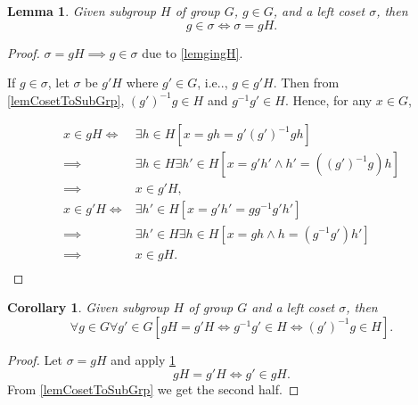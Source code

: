 \documentclass[12pt, letterpaper]{article}
\makeatletter
\newcommand\ie{i.e\@ifnextchar.{}{.\@}}
\newtheorem{lem}[prop]{Lemma}
\newtheorem{cor}[prop]{Corollary}
\theoremstyle{definition}
\theoremstyle{remark}
\theoremstyle{definition}
\theoremstyle{plain}
\numberwithin{equation}{section}
\makeatother
\begin{document}

	\begin{lem}\label{lemSameCoset}
		Given subgroup $H$ of group $G$, $g\in G$, and a left coset $\sigma$,
		then
		\[g\in \sigma\iff\sigma=gH. \]
	\end{lem}
	\begin{proof}
		$\sigma=gH\implies g\in\sigma$ due to \ref{lemgingH}.
		
		If $g\in \sigma$, let $\sigma$ be $g'H$ where $g'\in G$,
		\ie, $g\in g'H$.
		Then from \ref{lemCosetToSubGrp}, $(g')^{-1}g\in H$ and $g^{-1}g'\in H$.
		Hence, for any $x\in G$,
		
		\[ \begin{aligned}
			x\in gH \iff& \exists h\in H[x=gh=g'(g')^{-1}gh] \\
			\implies& \exists h \in H\exists h'\in H[x=g'h'\land h'=((g')^{-1}g)h]\\
			\implies &x\in g'H,\\
			x\in g'H\iff& \exists h'\in H[x=g'h'=gg^{-1}g'h'] \\
			\implies& \exists h' \in H\exists h\in H[x=gh\land h=(g^{-1}g')h']\\
			\implies &x\in gH.\\
		\end{aligned}\]
	\end{proof}

	\begin{cor}\label{lemgHg'H}
		Given subgroup $H$ of group $G$ and a left coset $\sigma$,
		then
		\[ \forall g\in G \forall g'\in G [gH=g'H\iff g^{-1}g'\in H\iff (g')^{-1}g\in H].\]
	\end{cor}
	\begin{proof}
		Let $\sigma=gH$ and apply \ref{lemSameCoset}
		\[gH=g'H\iff g'\in gH.\]
		From \ref{lemCosetToSubGrp} we get the second half.
	\end{proof}
\end{document}
